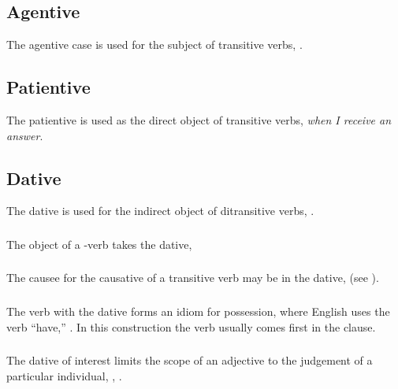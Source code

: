 \subsection{Agentive} The agentive case is used for the subject of
transitive verbs,  .

\subsection{Patientive} The patientive is used as the direct object of
transitive verbs, 
\textit{when I receive an answer}.

\subsection{Dative} The dative is used for the indirect object of
ditransitive verbs,  .

\subsubsection{} The object of a -verb takes the dative,   \label{syn:case:dative-si}

\subsubsection{} The causee for the causative of a transitive verb may
be in the dative,   (see ). 

\subsubsection{} The verb  with the dative forms an idiom for
possession, where English uses the verb ``have,'' 
.  In this construction the verb usually comes
first in the clause.  

\subsubsection{} The dative of interest limits the scope of an
adjective to the judgement  of a particular
individual,  ,
 .

